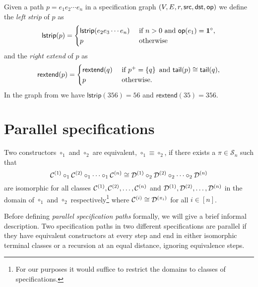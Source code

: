 Given a path $p = e_1e_2\dotsm e_n$ in a specification graph $(V,E,r,\textsf{src},\textsf{dst},\textsf{op})$ we define the \emph{left strip} of $p$ as
\[
     \textsf{lstrip}(p) = \begin{cases} \textsf{lstrip}(e_2e_3\dotsm e_n) & \text{ if } n > 0 \text{ and } \textsf{op}(e_1) = \mathbf{1}^\circ,\\
     p & \text{ otherwise}
     \end{cases}
\]
and the \emph{right extend} of $p$ as
\[
    \textsf{rextend}(p) = \begin{cases}
        \textsf{rextend}(q) & \text{ if } p^+ = \left\{q\right\} \text{ and } \textsf{tail}(p) \cong \textsf{tail}(q),\\
        p & \text{ otherwise}.
    \end{cases}
\]
In the graph from  we have $\textsf{lstrip}(356) = 56$ and $\textsf{rextend}(35) = 356$.

\section{Parallel specifications}
\begin{definition}
Two constructors $\circ_1$ and $\circ_2$ are equivalent, $\circ_1 \equiv \circ_2$, if there exists a $\pi\in\mathcal{S}_n$ such that
\[
    \mathcal{C}^{\left(1\right)} \circ_1 \mathcal{C}^{\left(2\right)} \circ_1 \dotsm \circ_1 \mathcal{C}^{\left(n\right)} \cong \mathcal{D}^{\left(1\right)} \circ_2 \mathcal{D}^{\left(2\right)} \circ_2 \dotsm \circ_2 \mathcal{D}^{\left(n\right)}
\]
are isomorphic for all classes $\mathcal{C}^{\left(1\right)},\mathcal{C}^{\left(2\right)},\dotsc,\mathcal{C}^{\left(n\right)}$ and $\mathcal{D}^{\left(1\right)},\mathcal{D}^{\left(2\right)},\dotsc,\mathcal{D}^{\left(n\right)}$ in the domain of $\circ_1$ and $\circ_2$ respectively\footnote{For our purposes it would suffice to restrict the domains to classes of specifications.} where $\mathcal{C}^{\left(i\right)}\cong\mathcal{D}^{\left(\pi_i\right)}$ for all $i\in[n]$.
\end{definition}

Before defining \emph{parallel specification paths} formally, we will give a brief informal description. Two specification paths in two different specifications are parallel if they have equivalent constructors at every step and end in either isomorphic terminal classes or a recursion at an equal distance, ignoring equivalence steps.

